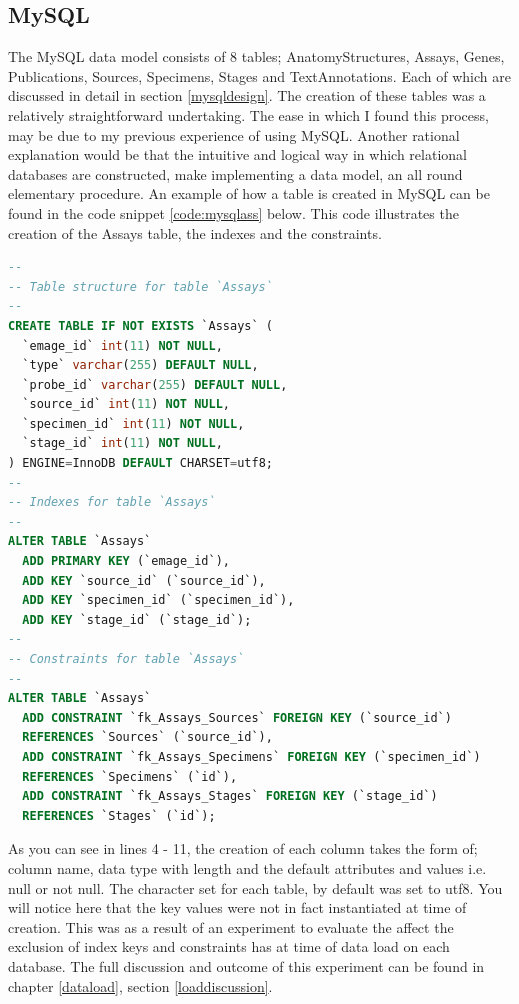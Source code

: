 \subsection{MySQL}
The MySQL data model consists of 8 tables; AnatomyStructures, Assays, Genes, Publications, Sources, Specimens, Stages and TextAnnotations. Each of which are discussed in detail in section \ref{mysqldesign}. The creation of these tables was a relatively straightforward undertaking. The ease in which I found this process, may be due to my previous experience of using MySQL. Another rational explanation would be that the intuitive and logical way in which relational databases are constructed, make implementing a data model, an all round elementary procedure. An example of how a table is created in MySQL can be found in the code snippet \ref{code:mysqlass} below. This code illustrates the creation of the Assays table, the indexes and the constraints.
\newpage
\vspace*{\fill}
\begin{lstlisting}[language=SQL, caption=Creation of Assays table in MySQL., label=code:mysqlass]
--
-- Table structure for table `Assays`
--
CREATE TABLE IF NOT EXISTS `Assays` (
  `emage_id` int(11) NOT NULL,
  `type` varchar(255) DEFAULT NULL,
  `probe_id` varchar(255) DEFAULT NULL,
  `source_id` int(11) NOT NULL,
  `specimen_id` int(11) NOT NULL,
  `stage_id` int(11) NOT NULL,
) ENGINE=InnoDB DEFAULT CHARSET=utf8;
--
-- Indexes for table `Assays`
--
ALTER TABLE `Assays`
  ADD PRIMARY KEY (`emage_id`),
  ADD KEY `source_id` (`source_id`),
  ADD KEY `specimen_id` (`specimen_id`),
  ADD KEY `stage_id` (`stage_id`);
--
-- Constraints for table `Assays`
--
ALTER TABLE `Assays`
  ADD CONSTRAINT `fk_Assays_Sources` FOREIGN KEY (`source_id`)
  REFERENCES `Sources` (`source_id`),
  ADD CONSTRAINT `fk_Assays_Specimens` FOREIGN KEY (`specimen_id`)
  REFERENCES `Specimens` (`id`),
  ADD CONSTRAINT `fk_Assays_Stages` FOREIGN KEY (`stage_id`)
  REFERENCES `Stages` (`id`);
\end{lstlisting}
\vspace*{\fill}
\newpage

As you can see in lines 4 - 11, the creation of each column takes the form of; column name, data type with length and the default attributes and values i.e. null or not null. The character set for each table, by default was set to utf8. You will notice here that the key values were not in fact instantiated at time of creation. This was as a result of an experiment to evaluate the affect the exclusion of index keys and constraints has at time of data load on each database. The full discussion and outcome of this experiment can be found in chapter \ref{dataload}, section \ref{loaddiscussion}.

